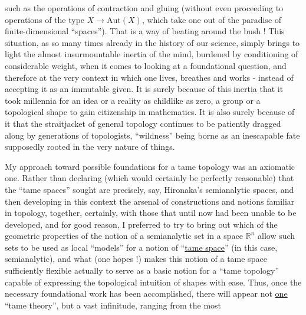 
such as the operations of contraction and gluing (without even proceeding
to operations of the type $X \longrightarrow \mathrm{Aut}(X)$, which take one out of the
paradise of finite-dimensional ``spaces''). That is a way of
beating around the bush ! This situation, as so many times already in
the history of our science, simply brings to light the almost
insurmountable inertia of the mind, burdened by conditioning
of considerable weight, when it comes to looking at a
foundational question, and therefore at the very context in which one lives,
breathes and works - instead of accepting it as an immutable
given. It is surely because of this inertia that it took
millennia for an idea or a reality as childlike as
zero, a group or a topological shape to gain citizenship
in mathematics. It is also surely because of it that the straitjacket
of general topology continues to be patiently dragged along by
generations of topologists, ``wildness'' being borne as
an inescapable fate supposedly rooted in the very nature
of things.

My approach toward possible foundations for a tame
topology was an axiomatic one. Rather than declaring
(which would certainly be perfectly reasonable) that
the ``tame spaces'' sought are precisely, say,
Hironaka's semianalytic spaces, and then developing in
this context the arsenal of constructions and notions familiar in
topology, together, certainly, with those that until now had been
unable to be developed, and for good reason, I preferred to try to bring out
which of the geometric properties of the notion of a semianalytic
set in a space $\mathbb{R}^{n}$ allow such sets to be used as
local ``models'' for a notion of ``\uline{tame space}'' (in this case,
semianalytic), and what (one hopes !) makes this notion of a
tame space sufficiently flexible actually to serve
as a basic notion for a ``tame topology'' capable of expressing
the topological intuition of shapes with ease. Thus, once
the necessary foundational work has been accomplished, there will appear not
\uline{one} ``tame theory'', but a vast infinitude, ranging from the most



